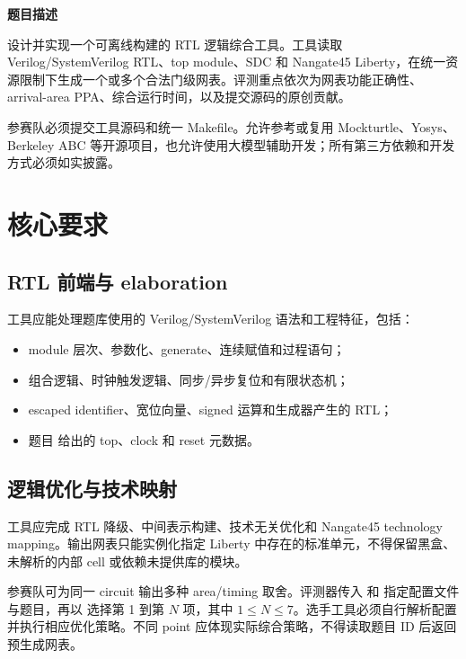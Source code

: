 \documentclass[UTF8,a4paper,11pt,fontset=fandol]{ctexart}
\begin{document}

{\color{Accent}\bfseries\LARGE 题目描述}\par
\vspace{0.35em}
设计并实现一个可离线构建的 RTL 逻辑综合工具。工具读取 Verilog/SystemVerilog RTL、top module、SDC 和 Nangate45 Liberty，在统一资源限制下生成一个或多个合法门级网表。评测重点依次为网表功能正确性、arrival-area PPA、综合运行时间，以及提交源码的原创贡献。

参赛队必须提交工具源码和统一 Makefile。允许参考或复用 Mockturtle、Yosys、Berkeley ABC 等开源项目，也允许使用大模型辅助开发；所有第三方依赖和开发方式必须如实披露。

\section{核心要求}

\subsection{RTL 前端与 elaboration}

工具应能处理题库使用的 Verilog/SystemVerilog 语法和工程特征，包括：

\begin{itemize}
  \item module 层次、参数化、generate、连续赋值和过程语句；
  \item 组合逻辑、时钟触发逻辑、同步/异步复位和有限状态机；
  \item escaped identifier、宽位向量、signed 运算和生成器产生的 RTL；
  \item 题目  给出的 top、clock 和 reset 元数据。
\end{itemize}

\subsection{逻辑优化与技术映射}

工具应完成 RTL 降级、中间表示构建、技术无关优化和 Nangate45 technology mapping。输出网表只能实例化指定 Liberty 中存在的标准单元，不得保留黑盒、未解析的内部 cell 或依赖未提供库的模块。

参赛队可为同一 circuit 输出多种 area/timing 取舍。评测器传入  和  指定配置文件与题目，再以  选择第 1 到第 \(N\) 项，其中 \(1\leq N\leq 7\)。选手工具必须自行解析配置并执行相应优化策略。不同 point 应体现实际综合策略，不得读取题目 ID 后返回预生成网表。
\end{document}

